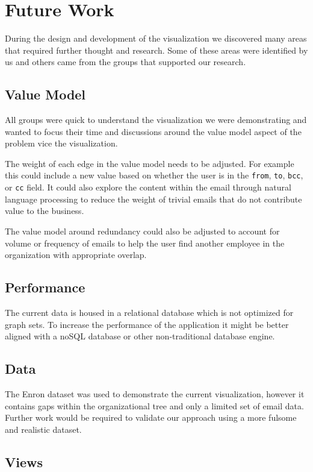 \documentclass[journal]{vgtc}                %
\begin{document}
{{\section{Future Work}
\label{sec:future}
During the design and development of the visualization we discovered many areas that required further thought and research.  Some of these areas were identified by us and others came from the groups that supported our research.

\subsection{Value Model}
All groups were quick to understand the visualization we were demonstrating and wanted to focus their time and discussions around the value model aspect of the problem vice the visualization.

The weight of each edge in the value model needs to be adjusted.  For example this could include a new value based on whether the user is in the \texttt{from}, \texttt{to}, \texttt{bcc}, or \texttt{cc} field.  It could also explore the content within the email through natural language processing to reduce the weight of trivial emails that do not contribute value to the business.

The value model around redundancy could also be adjusted to account for volume or frequency of emails to help the user find another employee in the organization with appropriate overlap.

\subsection{Performance}

The current data is housed in a relational database which is not optimized for graph sets.  To increase the performance of the application it might be better aligned with a noSQL database or other non-traditional database engine.

\subsection{Data}

The Enron dataset was used to demonstrate the current visualization, however it contains gaps within the organizational tree and only a limited set of email data.  Further work would be required to validate our approach using a more fulsome and realistic dataset.

\subsection{Views}

}}
\end{document}
